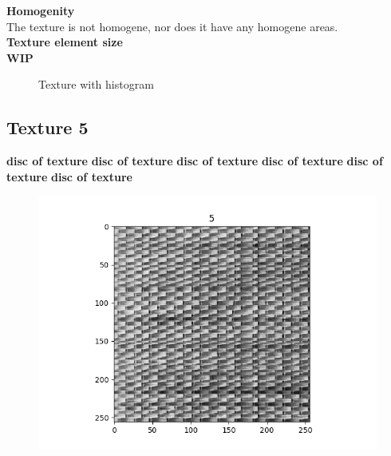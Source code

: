 \documentclass{article}
\begin{document}
\textbf{Homogenity}\\
The texture is not homogene, nor does it have any homogene areas.\\

\textbf{Texture element size}\\
\textbf{WIP}
\\

\begin{figure}[h]%
	\centering
    \qquad
    \caption{Texture with histogram}%
    \label{fig:IMG4}%
\end{figure}
\newpage


\subsection{Texture 5}
\textbf{disc of texture}
\textbf{disc of texture}
\textbf{disc of texture}
\textbf{disc of texture}
\textbf{disc of texture}
\textbf{disc of texture}
\begin{figure}[h!]
\includegraphics[scale=0.5]{5.png}
\end{figure}
\end{document}
